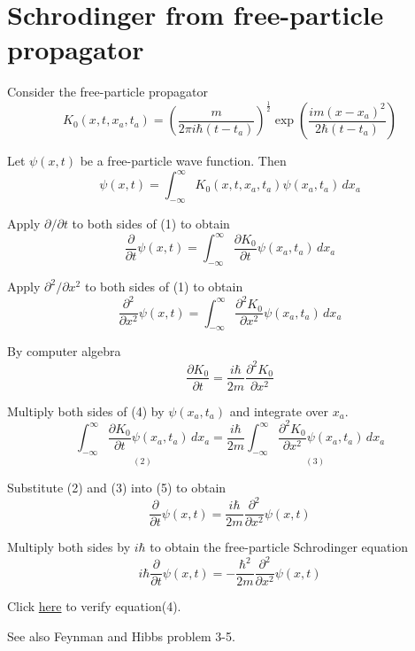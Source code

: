 

\section*{Schrodinger from free-particle propagator}

Consider the free-particle propagator
\begin{equation*}
K_0(x,t,x_a,t_a)=\left(\frac{m}{2\pi i\hbar(t-t_a)}\right)^\frac{1}{2}
\exp\left(\frac{im(x-x_a)^2}{2\hbar(t-t_a)}\right)
\end{equation*}

Let $\psi(x,t)$ be a free-particle wave function.
Then
\begin{equation*}
\psi(x,t)=\int_{-\infty}^\infty K_0(x,t,x_a,t_a)\psi(x_a,t_a)\,dx_a
\tag{1}
\end{equation*}

Apply $\partial/\partial t$ to both sides of (1) to obtain
\begin{equation*}
\frac{\partial}{\partial t}\psi(x,t)
=\int_{-\infty}^\infty\frac{\partial K_0}{\partial t}
\psi(x_a,t_a)\,dx_a
\tag{2}
\end{equation*}

Apply $\partial^2/\partial x^2$ to both sides of (1) to obtain
\begin{equation*}
\frac{\partial^2}{\partial x^2}\psi(x,t)
=\int_{-\infty}^\infty\frac{\partial^2 K_0}{\partial x^2}
\psi(x_a,t_a)\,dx_a
\tag{3}
\end{equation*}

By computer algebra
\begin{equation*}
\frac{\partial K_0}{\partial t}
=\frac{i\hbar}{2m}\frac{\partial^2K_0}{\partial x^2}
\tag{4}
\end{equation*}

Multiply both sides of (4) by $\psi(x_a,t_a)$ and integrate over $x_a$.
\begin{equation*}
\underset{(2)}{\int_{-\infty}^\infty\frac{\partial K_0}{\partial t}\psi(x_a,t_a)\,dx_a}
=\frac{i\hbar}{2m}\underset{(3)}
{\int_{-\infty}^\infty\frac{\partial^2K_0}{\partial x^2}
\psi(x_a,t_a)\,dx_a}
\tag{5}
\end{equation*}

Substitute (2) and (3) into (5) to obtain
\begin{equation*}
\frac{\partial}{\partial t}\psi(x,t)
=\frac{i\hbar}{2m}\frac{\partial^2}{\partial x^2}\psi(x,t)
\end{equation*}

Multiply both sides by $i\hbar$ to obtain the free-particle Schrodinger equation
\begin{equation*}
i\hbar\frac{\partial}{\partial t}\psi(x,t)
=-\frac{\hbar^2}{2m}\frac{\partial^2}{\partial x^2}\psi(x,t)
\end{equation*}

Click \href{https://georgeweigt.github.io/blog/109.html}{here} to verify equation(4).

\bigskip
See also Feynman and Hibbs problem 3-5.

